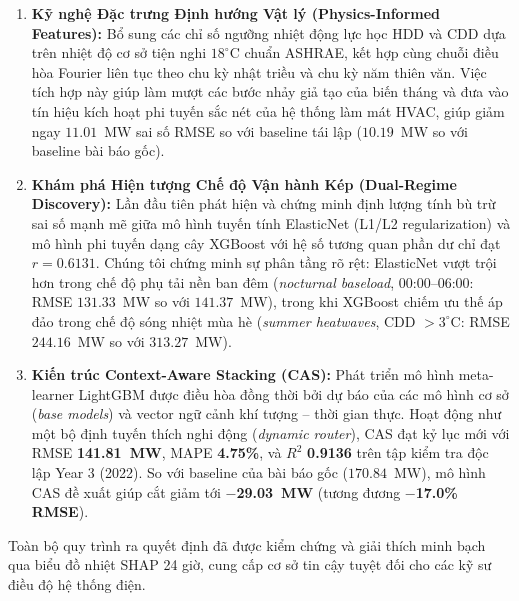 \begin{enumerate}
    \item \textbf{Kỹ nghệ Đặc trưng Định hướng Vật lý (Physics-Informed Features):} Bổ sung các chỉ số ngưỡng nhiệt động lực học $\text{HDD}$ và $\text{CDD}$ dựa trên nhiệt độ cơ sở tiện nghi $18^\circ\text{C}$ chuẩn ASHRAE, kết hợp cùng chuỗi điều hòa Fourier liên tục theo chu kỳ nhật triều và chu kỳ năm thiên văn. Việc tích hợp này giúp làm mượt các bước nhảy giả tạo của biến tháng và đưa vào tín hiệu kích hoạt phi tuyến sắc nét của hệ thống làm mát HVAC, giúp giảm ngay $11.01$~MW sai số RMSE so với baseline tái lập ($10.19$~MW so với baseline bài báo gốc).
    \item \textbf{Khám phá Hiện tượng Chế độ Vận hành Kép (Dual-Regime Discovery):} Lần đầu tiên phát hiện và chứng minh định lượng tính bù trừ sai số mạnh mẽ giữa mô hình tuyến tính ElasticNet (L1/L2 regularization) và mô hình phi tuyến dạng cây XGBoost với hệ số tương quan phần dư chỉ đạt $r = 0.6131$. Chúng tôi chứng minh sự phân tầng rõ rệt: ElasticNet vượt trội hơn trong chế độ phụ tải nền ban đêm (\textit{nocturnal baseload}, 00:00--06:00: RMSE $131.33$~MW so với $141.37$~MW), trong khi XGBoost chiếm ưu thế áp đảo trong chế độ sóng nhiệt mùa hè (\textit{summer heatwaves}, CDD $> 3^\circ\text{C}$: RMSE $244.16$~MW so với $313.27$~MW).
    \item \textbf{Kiến trúc Context-Aware Stacking (CAS):} Phát triển mô hình meta-learner LightGBM được điều hòa đồng thời bởi dự báo của các mô hình cơ sở (\textit{base models}) và vector ngữ cảnh khí tượng -- thời gian thực. Hoạt động như một bộ định tuyến thích nghi động (\textit{dynamic router}), CAS đạt kỷ lục mới với RMSE \textbf{141.81~MW}, MAPE \textbf{4.75\%}, và $R^2$ \textbf{0.9136} trên tập kiểm tra độc lập Year 3 (2022). So với baseline của bài báo gốc ($170.84$~MW), mô hình CAS đề xuất giúp cắt giảm tới \textbf{$-$29.03~MW} (tương đương \textbf{$-$17.0\% RMSE}).
\end{enumerate}

Toàn bộ quy trình ra quyết định đã được kiểm chứng và giải thích minh bạch qua biểu đồ nhiệt SHAP 24 giờ, cung cấp cơ sở tin cậy tuyệt đối cho các kỹ sư điều độ hệ thống điện.

